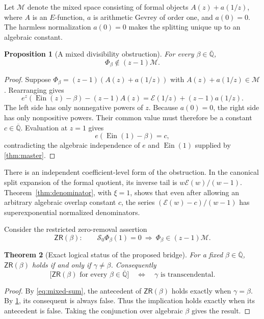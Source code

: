 \documentclass[11pt]{article}
\newtheorem{theorem}{Theorem}[section]
\newtheorem{proposition}[theorem]{Proposition}
\theoremstyle{definition}
\theoremstyle{remark}
\newcommand{\Qb}{\overline{\mathbb Q}}
\newcommand{\Ein}{\operatorname{Ein}}
\newcommand{\Eul}{\mathcal E}
\begin{document}
Let \(\mathcal M\) denote the mixed space consisting of formal objects
\(A(z)+a(1/z)\), where \(A\) is an \(E\)-function, \(a\) is arithmetic
Gevrey of order one, and \(a(0)=0\).  The harmless normalization \(a(0)=0\)
makes the splitting unique up to an algebraic constant.

\begin{proposition}[A mixed divisibility obstruction]\label{prop:nonmixed}
For every \(\beta\in\Qb\),
\[
 \Phi_\beta\notin(z-1)\mathcal M.
\]
\end{proposition}

\begin{proof}
Suppose
\(\Phi_\beta=(z-1)(A(z)+a(1/z))\) with \(A(z)+a(1/z)\in\mathcal M\).
Rearranging gives
\[
 e^z(\Ein(z)-\beta)-(z-1)A(z)
 =\Eul(1/z)+(z-1)a(1/z).
\]
The left side has only nonnegative powers of \(z\).  Because \(a(0)=0\),
the right side has only nonpositive powers.  Their common value must therefore
be a constant \(c\in\Qb\).  Evaluation at \(z=1\) gives
\[
 e(\Ein(1)-\beta)=c,
\]
contradicting the algebraic independence of \(e\) and \(\Ein(1)\) supplied
by \cref{thm:master}.
\end{proof}

There is an independent coefficient-level form of the obstruction.  In the
canonical split expansion of the formal quotient, its inverse tail is
\(w\Eul(w)/(w-1)\).  Theorem~\ref{thm:denominator}, with \(\xi=1\), shows
that even after allowing an arbitrary algebraic overlap constant \(c\), the
series \((\Eul(w)-c)/(w-1)\) has superexponential normalized denominators.

Consider the restricted zero-removal assertion
\begin{equation}\label{eq:zr-beta}
 \mathsf{ZR}(\beta):\qquad
 \mathcal S_0\Phi_\beta(1)=0
 \ \Longrightarrow\ 
 \Phi_\beta\in(z-1)\mathcal M.
\end{equation}

\begin{theorem}[Exact logical status of the proposed bridge]\label{thm:bridge}
For a fixed \(\beta\in\Qb\), \(\mathsf{ZR}(\beta)\) holds if and only if
\(\gamma\ne\beta\).  Consequently
\[
 \bigl[\mathsf{ZR}(\beta)\text{ for every }\beta\in\Qb\bigr]
 \quad\Longleftrightarrow\quad
 \gamma\text{ is transcendental}.
\]
\end{theorem}

\begin{proof}
By \eqref{eq:mixed-sum}, the antecedent of \(\mathsf{ZR}(\beta)\) holds
exactly when \(\gamma=\beta\).  By \cref{prop:nonmixed}, its consequent is
always false.  Thus the implication holds exactly when its antecedent is
false.  Taking the conjunction over algebraic \(\beta\) gives the result.
\end{proof}
\end{document}
